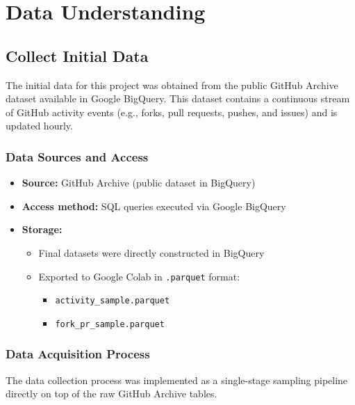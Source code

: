 \section{Data Understanding}
\subsection{Collect Initial Data}

The initial data for this project was obtained from the public GitHub Archive dataset available in Google BigQuery. This dataset contains a continuous stream of GitHub activity events (e.g., forks, pull requests, pushes, and issues) and is updated hourly.

\subsubsection{Data Sources and Access}

\begin{itemize}
    \item \textbf{Source:} GitHub Archive (public dataset in BigQuery)
    \item \textbf{Access method:} SQL queries executed via Google BigQuery
    \item \textbf{Storage:}
    \begin{itemize}
        \item Final datasets were directly constructed in BigQuery
        \item Exported to Google Colab in \texttt{.parquet} format:
        \begin{itemize}
            \item \texttt{activity\_sample.parquet}
            \item \texttt{fork\_pr\_sample.parquet}
        \end{itemize}
    \end{itemize}
\end{itemize}

\subsubsection{Data Acquisition Process}

The data collection process was implemented as a single-stage sampling pipeline directly on top of the raw GitHub Archive tables.

